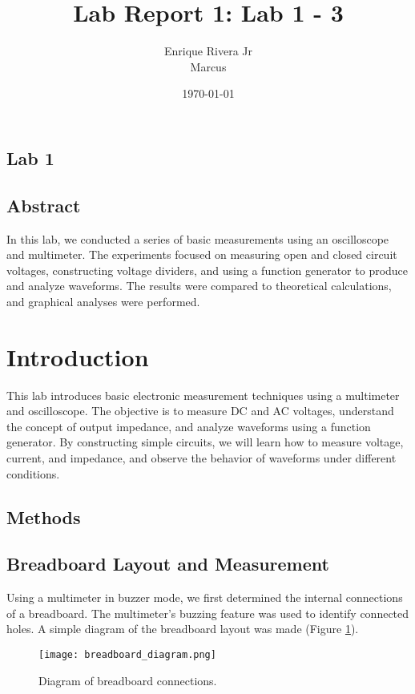 \documentclass{article}
\title{Lab Report 1: Lab 1 - 3}
\author{Enrique Rivera Jr \\ Marcus}
\date{\today}
\begin{document}
\maketitle

\begin{center}
\section*{Lab 1}
\end{center}


\subsection*{Abstract}
In this lab, we conducted a series of basic measurements using an oscilloscope and multimeter. The experiments focused on measuring open and closed circuit voltages, constructing voltage dividers, and using a function generator to produce and analyze waveforms. The results were compared to theoretical calculations, and graphical analyses were performed.

\section{Introduction}
This lab introduces basic electronic measurement techniques using a multimeter and oscilloscope. The objective is to measure DC and AC voltages, understand the concept of output impedance, and analyze waveforms using a function generator. By constructing simple circuits, we will learn how to measure voltage, current, and impedance, and observe the behavior of waveforms under different conditions.

\subsection{Methods}
\subsection{Breadboard Layout and Measurement}
Using a multimeter in buzzer mode, we first determined the internal connections of a breadboard. The multimeter's buzzing feature was used to identify connected holes. A simple diagram of the breadboard layout was made (Figure \ref{fig:breadboard}).

\begin{figure}[H]
    \centering
    \texttt{[image: breadboard\_diagram.png]} %
    \caption{Diagram of breadboard connections.}
    \label{fig:breadboard}
\end{figure}
\end{document}

